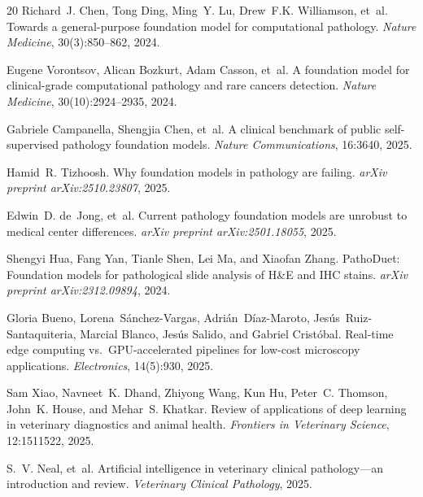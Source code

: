 \documentclass{article}
\begin{document}
{\begin{thebibliography}{20}
Richard~J. Chen, Tong Ding, Ming~Y. Lu, Drew~F.K. Williamson, et~al.
\newblock Towards a general-purpose foundation model for computational pathology.
\newblock \emph{Nature Medicine}, 30(3):850--862, 2024.

Eugene Vorontsov, Alican Bozkurt, Adam Casson, et~al.
\newblock A foundation model for clinical-grade computational pathology and rare cancers detection.
\newblock \emph{Nature Medicine}, 30(10):2924--2935, 2024.

Gabriele Campanella, Shengjia Chen, et~al.
\newblock A clinical benchmark of public self-supervised pathology foundation models.
\newblock \emph{Nature Communications}, 16:3640, 2025.

Hamid~R. Tizhoosh.
\newblock Why foundation models in pathology are failing.
\newblock \emph{arXiv preprint arXiv:2510.23807}, 2025.

Edwin~D. de~Jong, et~al.
\newblock Current pathology foundation models are unrobust to medical center differences.
\newblock \emph{arXiv preprint arXiv:2501.18055}, 2025.

Shengyi Hua, Fang Yan, Tianle Shen, Lei Ma, and Xiaofan Zhang.
\newblock PathoDuet: Foundation models for pathological slide analysis of {H\&E} and {IHC} stains.
\newblock \emph{arXiv preprint arXiv:2312.09894}, 2024.

Gloria Bueno, Lorena~S{\'a}nchez-Vargas, Adri{\'a}n~D{\'i}az-Maroto, Jes{\'u}s~Ruiz-Santaquiteria, Marcial Blanco, Jes{\'u}s Salido, and Gabriel Crist{\'o}bal.
\newblock Real-time edge computing vs.\ {GPU}-accelerated pipelines for low-cost microscopy applications.
\newblock \emph{Electronics}, 14(5):930, 2025.

Sam Xiao, Navneet~K. Dhand, Zhiyong Wang, Kun Hu, Peter~C. Thomson, John~K. House, and Mehar~S. Khatkar.
\newblock Review of applications of deep learning in veterinary diagnostics and animal health.
\newblock \emph{Frontiers in Veterinary Science}, 12:1511522, 2025.

S.~V. Neal, et~al.
\newblock Artificial intelligence in veterinary clinical pathology---an introduction and review.
\newblock \emph{Veterinary Clinical Pathology}, 2025.

\end{thebibliography}
}
\end{document}
